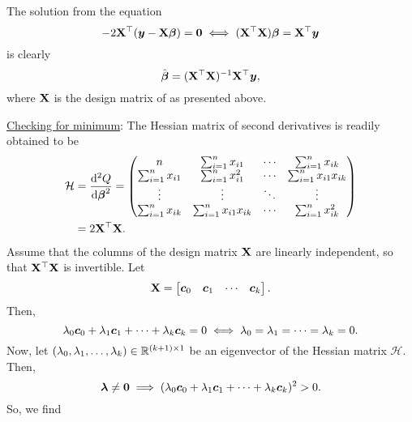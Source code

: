 The solution from the equation
\[ -2 \mathbf{X}^\top({\boldsymbol y}-\mathbf{X}{\boldsymbol \beta})={\boldsymbol 0}\iff
    (\mathbf{X}^\top \mathbf{X}){\boldsymbol \beta}=\mathbf{X}^\top {\boldsymbol y} \]
is clearly
\[ \hat{{\boldsymbol \beta}}=(\mathbf{X}^\top \mathbf{X})^{-1}\mathbf{X}^\top {\boldsymbol y}, \]
where $ \mathbf{X} $ is the design matrix of as presented above.

\underline{Checking for minimum}:
The Hessian matrix of second derivatives is readily obtained to be
\begin{align*}
    \mathcal{H}
     & =\odv[order=2]{Q}{\Vector{\beta}}=\begin{pmatrix}
                                             n                    & \sum_{i=1}^{n}x_{i1}       & \cdots & \sum_{i=1}^{n}x_{ik}       \\
                                             \sum_{i=1}^{n}x_{i1} & \sum_{i=1}^{n}x_{i1}^2     & \cdots & \sum_{i=1}^{n}x_{i1}x_{ik} \\
                                             \vdots               & \vdots                     & \ddots & \vdots                     \\
                                             \sum_{i=1}^{n}x_{ik} & \sum_{i=1}^{n}x_{i1}x_{ik} & \cdots & \sum_{i=1}^{n}x_{ik}^2
                                         \end{pmatrix} \\
     & =2 \Matrix{X}^\top \Matrix{X}.
\end{align*}
Assume that the columns of the design matrix $ \mathbf{X} $
are linearly independent, so that $ \mathbf{X}^\top \mathbf{X} $
is invertible. Let
\[ \mathbf{X}=\begin{bmatrix}
        {\boldsymbol c}_0 & {\boldsymbol c}_1 & \cdots & {\boldsymbol c}_k
    \end{bmatrix}. \]
Then,
\[ \lambda_0 {\boldsymbol c}_0+\lambda_1 {\boldsymbol c}_1+\cdots+\lambda_k {\boldsymbol c}_k=0
    \iff \lambda_0=\lambda_1=\cdots=\lambda_k=0. \]
Now, let
$ (\lambda_0,\lambda_1,\ldots,\lambda_k)\in\mathbb{R}^{(k+1)\times 1} $
be an eigenvector of the Hessian matrix $ \mathcal{H} $. Then,
\[ {\boldsymbol \lambda}\ne {\boldsymbol 0}\implies
    (\lambda_0 {\boldsymbol c}_0+\lambda_1 {\boldsymbol c}_1+\cdots+\lambda_k {\boldsymbol c}_k)^2>0. \]
So, we find
